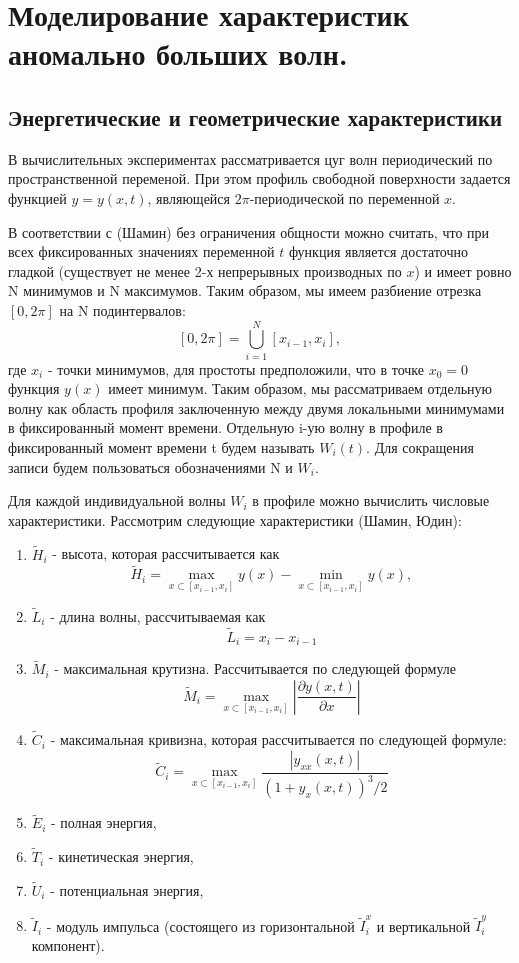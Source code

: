 \section{Моделирование характеристик аномально больших волн.} \label{sect3_3}

\subsection{Энергетические и геометрические характеристики}
В вычислительных экспериментах рассматривается цуг волн периодический по пространственной переменой. При этом профиль свободной поверхности задается функцией $y=y(x,t)$, являющейся $2\pi$-периодической по переменной $x$.

В соответствии с (Шамин) без ограничения общности можно считать, что при всех фиксированных значениях переменной $t$ функция  является достаточно гладкой (существует не менее 2-х непрерывных производных по $x$) и имеет ровно N минимумов и N максимумов. Таким образом, мы имеем разбиение отрезка $[0,2\pi]$ на N подинтервалов:
$$
[0,2\pi]=\bigcup\limits_{i=1}^N[x_{i-1},x_i],
$$
где $x_i$ - точки минимумов, для простоты предположили, что в точке $x_0=0$ функция $y(x)$ имеет минимум. Таким образом, мы рассматриваем отдельную волну как область профиля заключенную между двумя локальными минимумами в фиксированный момент времени. Отдельную i-ую волну в профиле в фиксированный момент времени t будем называть $W_i(t)$. Для сокращения записи будем пользоваться обозначениями N и $W_i$.

Для каждой индивидуальной волны $W_i$ в профиле можно вычислить числовые характеристики.
Рассмотрим следующие характеристики (Шамин, Юдин):
\begin{enumerate}
  \item $\tilde{H}_i$ - высота, которая рассчитывается как
  $$
  \tilde{H}_i=\max_{x\subset[x_{i-1},x_i]}y(x)-\min_{x\subset[x_{i-1},x_i]}y(x),
  $$
  \item $\tilde{L}_i$ - длина волны, рассчитываемая как
  $$
  \tilde{L}_i=x_i-x_{i-1}
  $$
  \item $\tilde{M}_i$ - максимальная крутизна. Рассчитывается по следующей формуле
  $$
  \tilde{M}_i=\max_{x\subset[x_{i-1},x_i]}|\frac{\partial y(x,t)}{\partial x}|
  $$
  \item $\tilde{C}_i$ - максимальная кривизна, которая рассчитывается по следующей формуле:
      $$
  \tilde{C}_i=\max_{x\subset[x_{i-1},x_i]}\frac{|y_{xx}(x,t)|}{(1+y_x(x,t))^3/2}
  $$
  \item $\tilde{E}_i$ - полная энергия,
  \item $\tilde{T}_i$  - кинетическая энергия,
  \item $\tilde{U}_i$ - потенциальная энергия,
  \item $\tilde{I}_i$ - модуль импульса (состоящего из горизонтальной $\tilde{I}_i^{x}$ и вертикальной $\tilde{I}_i^{y}$ компонент).
\end{enumerate}

